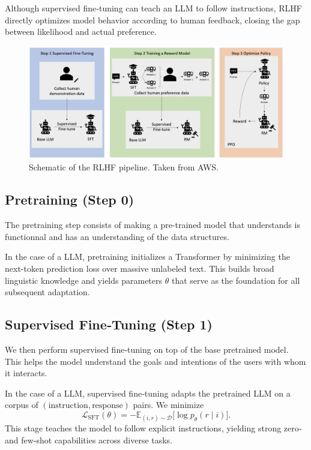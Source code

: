 \documentclass{article}
\begin{document}
Although supervised fine‑tuning can teach an LLM to follow instructions, RLHF directly optimizes model behavior according to human feedback, closing the gap between likelihood and actual preference.

\begin{figure}[ht]
    \centering
    \includegraphics[width=0.95\linewidth]{graphics/S11RLHF/rlhf.jpg}
    \caption{Schematic of the RLHF pipeline. Taken from AWS.}
    \label{fig:rlhf-pipeline}
\end{figure}

\subsection{Pretraining (Step 0)}

The pretraining step consists of making a pre-trained model that understands  is functionnal and has an understanding of the data structures.

In the case of a LLM, pretraining initializes a Transformer by minimizing the next-token prediction loss over massive unlabeled text. This builds broad linguistic knowledge and yields parameters \(\theta\) that serve as the foundation for all subsequent adaptation.

\subsection{Supervised Fine‑Tuning (Step 1)}

We then perform supervised fine‑tuning on top of the base pretrained model. This helps the model understand the goals and intentions of the users with whom it interacts.

In the case of a LLM, supervised fine‑tuning adapts the pretrained LLM on a corpus of \((\text{instruction},\text{response})\) pairs.  We minimize
\[
  \mathcal{L}_{\mathrm{SFT}}(\theta) = -\mathbb{E}_{(i,r)\sim\mathcal{D}}\bigl[\log p_\theta(r\mid i)\bigr].
\]
This stage teaches the model to follow explicit instructions, yielding strong zero‑ and few‑shot capabilities across diverse tasks.
\end{document}
